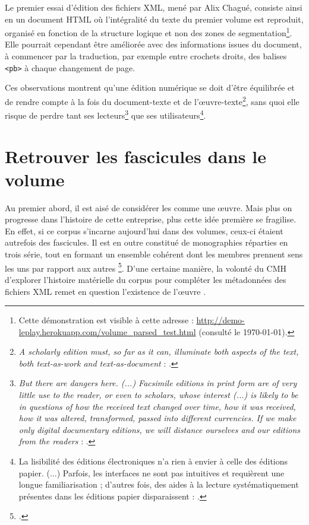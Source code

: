 Le premier essai d'édition des fichiers XML, mené par Alix Chagué, consiste ainsi en un document HTML où l'intégralité du texte du premier volume est reproduit, organisé en fonction de la structure logique et non des zones de segmentation\footnote{Cette démonstration est visible à cette adresse : \url{http://demo-leplay.herokuapp.com/volume_parsed_test.html} (consulté le \today).}. Elle pourrait cependant être améliorée avec des informations issues du document, à commencer par la traduction, par exemple entre crochets droits, des balises \texttt{<pb>} à chaque changement de page.

Ces observations montrent qu'une édition numérique se doit d'être équilibrée et de rendre compte à la fois du document-texte et de l'\oe{}uvre-texte\footnote{\og \textit{A scholarly edition must, so far as it can, illuminate both aspects of the text, both text-as-work and text-as-document} \fg{} : \cite[p. 123]{robinson}.}, sans quoi elle risque de perdre tant ses lecteurs\footnote{\og \textit{But there are dangers here. (...) Facsimile editions in print form are of very little use to the reader, or even to scholars, whose interest (...) is likely to be in questions of how the received text changed over time, how it was received, how it was altered, transformed, passed into different currencies. If we make only digital documentary editions, we will distance ourselves and our editions from the readers} \fg{} : \cite[p. 127]{robinson}.} que ses utilisateurs\footnote{\og La lisibilité des éditions électroniques n’a rien à envier à celle des éditions papier. (...) Parfois, les interfaces ne sont pas intuitives et requièrent une longue familiarisation ; d’autres fois, des aides à la lecture systématiquement présentes dans les éditions papier disparaissent \fg{} : \cite[p. 21]{duval}.}.

\section{Retrouver les fascicules dans le volume}

Au premier abord, il est aisé de considérer les \odm{} comme une \oe{}uvre. Mais plus on progresse dans l'histoire de cette entreprise, plus cette idée première se fragilise. En effet, si ce corpus s'incarne aujourd'hui dans des volumes, ceux-ci étaient autrefois des fascicules. Il est en outre constitué de monographies réparties en trois série, tout en formant un ensemble cohérent dont les membres \og prennent sens les uns par rapport aux autres \fg{}\footcite[p. 5]{chenu}. D'une certaine manière, la volonté du CMH d'explorer l'histoire matérielle du corpus pour compléter les métadonnées des fichiers XML remet en question l'existence de \og l'\oe{}uvre \odm{} \fg{}.

